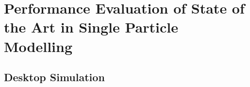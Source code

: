 

\graphicspath{{chapters/spm_analysis/figures/}}

\clearpage
\chapter{Performance Evaluation of State of the Art in Single Particle Modelling}\label{ch:spmanalysis}
\startcontents[chapters]

\bigskip

% 

% 

% 

\section{Desktop Simulation}\label{sec:basicspmsimresults}



% 

% 

